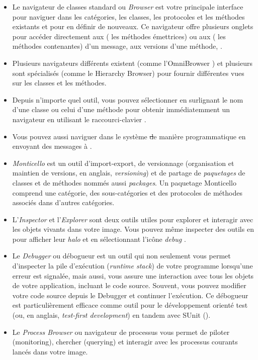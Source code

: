 \documentclass[a4paper,10pt,twoside]{book}
\begin{document}
\begin{itemize}
  \item Le navigateur de classes standard ou \emph{Browser} est votre principale interface pour naviguer dans les catégories, les classes, les protocoles et les méthodes existants et pour en définir de nouveaux.
Ce navigateur offre plusieurs onglets pour accéder directement aux \senders (\ie{} les méthodes émettrices) ou aux \implementors (\ie{} les méthodes contenantes) d'un message, aux versions d'une méthode, 
\etc.
  \item Plusieurs navigateurs différents existent
(comme l'OmniBrowser )  
et plusieurs sont spécialisés (comme le Hierarchy Browser) pour fournir différentes vues sur les classes et les méthodes.
  \item Depuis n'importe quel outil, vous pouvez sélectionner en surlignant le nom d'une classe ou celui d'une méthode pour obtenir immédiatemment
un navigateur en utilisant le raccourci-clavier .
  \item Vous pouvez aussi naviguer dans le système \st de manière
programmatique en envoyant des messages à .
  \item \emph{Monticello} est un outil d'import-export, de versionnage
    (organisation et maintien de versions, en anglais, \emph{versioning}) et de partage de \emph{paquetages} de classes et de méthodes nommés aussi \emph{packages}.
  Un paquetage Monticello comprend une catégorie, des sous-catégories et des protocoles de méthodes associés dans d'autres catégories. 
  \item L'\emph{Inspector} et l'\emph{Explorer} sont deux outils utiles
pour explorer et interagir avec les objets vivants dans votre image.
Vous pouvez même inspecter des outils en \actclickant{} pour
afficher leur \emph{halo} et en sélectionnant l'icône
\emph{debug} \debugHandle .
  \item Le \emph{Debugger} ou débogueur est un outil qui non seulement vous permet
d'inspecter la pile d'exécution (\emph{runtime stack}) de votre
programme lorsqu'une erreur est signalée, mais aussi, 
vous assure une interaction avec tous les objets de votre application,
incluant le code source. Souvent, vous pouvez modifier votre 
code source depuis le Debugger et continuer l'exécution.
Ce débogueur est particulièrement efficace comme outil pour
le développement orienté test (ou, en anglais, \emph{test-first development}) en tandem
avec 
SUnit ().
  \item Le \emph{Process Browser} ou navigateur de processus vous permet de piloter (monitoring), chercher (querying) et interagir avec les processus courants lancés dans votre image.

\end{itemize}
\end{document}
